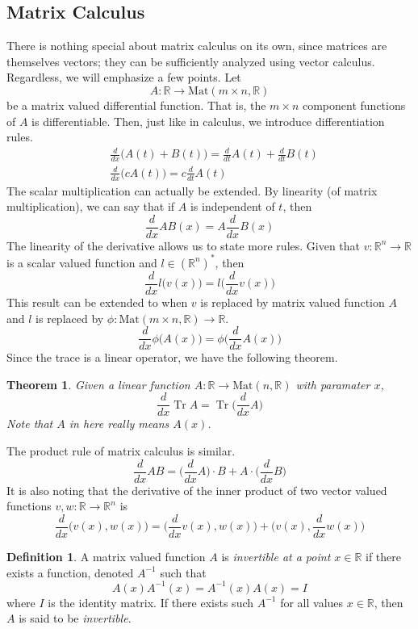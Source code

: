 \documentclass{article}
\DeclareMathOperator{\Tr}{Tr}
\newtheorem{theorem}{Theorem}[section]
\theoremstyle{remark}
\theoremstyle{definition}
\newtheorem{definition}{Definition}[section]
\begin{document}
\subsection{Matrix Calculus}
There is nothing special about matrix calculus on its own, since matrices are themselves vectors; they can be sufficiently analyzed using vector calculus. Regardless, we will emphasize a few points. Let
\[A: \mathbb{R} \longrightarrow \text{Mat}(m \times n, \mathbb{R})\]
be a matrix valued differential function. That is, the $m \times n$ component functions of $A$ is differentiable. Then, just like in calculus, we introduce differentiation rules.
\begin{align*}
    & \frac{d}{d x} \big( A(t) + B(t)\big) = \frac{d}{d t} A(t) + \frac{d}{d t} B(t) \\
    & \frac{d}{d x} \big( c A(t)\big) = c \frac{d}{d t} A(t)
\end{align*}
The scalar multiplication can actually be extended. By linearity (of matrix multiplication), we can say that if $A$ is independent of $t$, then 
\[\frac{d}{d x} A B (x) = A \frac{d}{d x} B(x)\]
The linearity of the derivative allows us to state more rules. Given that $v: \mathbb{R}^n \longrightarrow \mathbb{R}$ is a scalar valued function and $l \in (\mathbb{R}^n)^*$, then  
\[\frac{d}{d x} l \big( v(x) \big) = l \bigg( \frac{d}{d x} v(x) \bigg)\]
This result can be extended to when $v$ is replaced by matrix valued function $A$ and $l$ is replaced by $\phi: \text{Mat}(m \times n, \mathbb{R}) \longrightarrow \mathbb{R}$. 
\[\frac{d}{d x} \phi \big( A(x) \big) = \phi \bigg( \frac{d}{d x} A(x) \bigg)\]
Since the trace is a linear operator, we have the following theorem. 

\begin{theorem}
Given a linear function $A: \mathbb{R} \longrightarrow \text{Mat}(n, \mathbb{R})$ with paramater $x$, 
\[\frac{d}{d x} \Tr{A} = \Tr \bigg( \frac{d}{d x} A \bigg)\]
Note that $A$ in here really means $A(x)$.
\end{theorem}

The product rule of matrix calculus is similar.
\[\frac{d}{d x} A B = \bigg(\frac{d}{d x} A\bigg) \cdot B + A \cdot \bigg(\frac{d}{d x} B \bigg)\]
It is also noting that the derivative of the inner product of two vector valued functions $v, w: \mathbb{R} \longrightarrow \mathbb{R}^n$ is 
\[\frac{d}{d x} \big( v(x), w(x) \big) = \Big( \frac{d}{d x} v(x), w(x) \Big) + \Big( v(x), \frac{d}{d x} w(x) \Big)\]

\begin{definition}
A matrix valued function $A$ is \textit{invertible at a point $x \in \mathbb{R}$} if there exists a function, denoted $A^{-1}$ such that
\[A(x) A^{-1} (x) = A^{-1}(x) A(x) = I\]
where $I$ is the identity matrix. If there exists such $A^{-1}$ for all values $x \in \mathbb{R}$, then $A$ is said to be \textit{invertible}. 
\end{definition}
\end{document}

